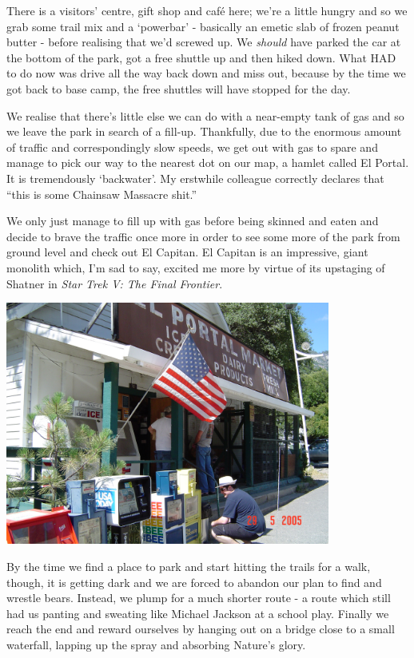 \documentclass[a5paper,titlepage,11pt,draft]{book}
\begin{document}
There is a visitors' centre, gift shop and caf\'{e} here; we're a little hungry and so we grab some trail mix and a `powerbar' - basically an emetic slab of frozen peanut butter - before realising that we'd screwed up.  We \emph{should} have parked the car at the bottom of the park, got a free shuttle up and then hiked down.  What HAD to do now was drive all the way back down and miss out, because by the time we got back to base camp, the free shuttles will have stopped for the day.

We realise that there's little else we can do with a near-empty tank of gas and so we leave the park in search of a fill-up.  Thankfully, due to the enormous amount of traffic and correspondingly slow speeds, we get out with gas to spare and manage to pick our way to the nearest dot on our map, a hamlet called El Portal.  It is tremendously `backwater'.  My erstwhile colleague correctly declares that ``this is some Chainsaw Massacre shit.''

We only just manage to fill up with gas before being skinned and eaten and decide to brave the traffic once more in order to see some more of the park from ground level and check out El Capitan.  El Capitan is an impressive, giant monolith which, I'm sad to say, excited me more by virtue of its upstaging of Shatner in \emph{Star Trek V: The Final Frontier}.

\begin{center}\includegraphics[width=0.8\textwidth]{gfx/DSC00663}\end{center}

By the time we find a place to park and start hitting the trails for a walk, though, it is getting dark and we are forced to abandon our plan to find and wrestle bears.  Instead, we plump for a much shorter route - a route which still had us panting and sweating like Michael Jackson at a school play.  Finally we reach the end and reward ourselves by hanging out on a bridge close to a small waterfall, lapping up the spray and absorbing Nature's glory.
\end{document}
